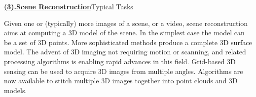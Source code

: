 \documentclass{beamer}
\begin{document}
{\begin{frame}{\textbf{\underline{(3).Scene Reconstruction}}}{Typical Tasks}\pause
\begin{figure}
\centering
{}
\end{figure}
Given one or (typically) more images of a scene, or a video, scene reconstruction aims at computing a 3D model of the scene. In the simplest case the model can be a set of 3D points. More sophisticated methods produce a complete 3D surface model. The advent of 3D imaging not requiring motion or scanning, and related processing algorithms is enabling rapid advances in this field. Grid-based 3D sensing can be used to acquire 3D images from multiple angles. Algorithms are now available to stitch multiple 3D images together into point clouds and 3D models.
\end{frame}


}
\end{document}
